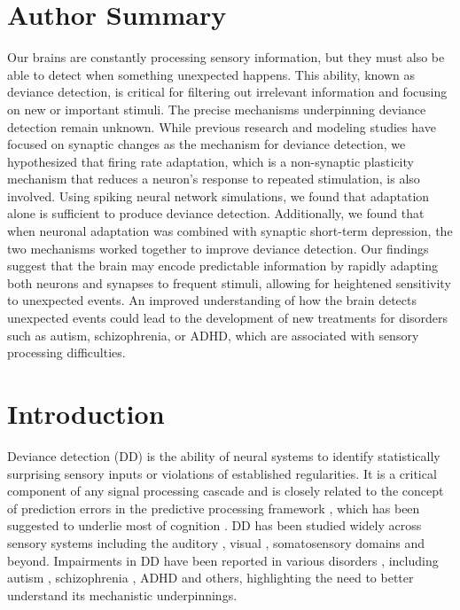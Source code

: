 \documentclass[9pt,lineno,onehalfspacing]{elife}
\begin{document}
\section{Author Summary}
Our brains are constantly processing sensory information, but they must also be able to detect when something unexpected happens. This ability, known as deviance detection, is critical for filtering out irrelevant information and focusing on new or important stimuli. The precise mechanisms underpinning deviance detection remain unknown. While previous research and modeling studies have focused on synaptic changes as the mechanism for deviance detection, we hypothesized that firing rate adaptation, which is a non-synaptic plasticity mechanism that reduces a neuron's response to repeated stimulation, is also involved. Using spiking neural network simulations, we found that adaptation alone is sufficient to produce deviance detection. Additionally, we found that when neuronal adaptation was combined with synaptic short-term depression, the two mechanisms worked together to improve deviance detection. Our findings suggest that the brain may encode predictable information by rapidly adapting both neurons and synapses to frequent stimuli, allowing for heightened sensitivity to unexpected events. An improved understanding of how the brain detects unexpected events could lead to the development of new treatments for disorders such as autism, schizophrenia, or ADHD, which are associated with sensory processing difficulties.


\section{Introduction}\label{sec:intro}

Deviance detection (DD) is the ability of neural systems to identify statistically surprising sensory inputs or violations of established regularities. It is a critical component of any signal processing cascade and is closely related to the concept of prediction errors in the predictive processing framework \citep{Bendixen2012-nx, Khouri2015-gr, Carbajal2018-sd, Fong2020-em}, which has been suggested to underlie most of cognition \citep{Friston2005-jz, Clark2015-gl}. DD has been studied widely across sensory systems including the auditory \citep{Nelken2014-wr, Escera2014-tv, Carbajal2018-sd}, visual \citep{Winkler2012-pr, Pazo-Alvarez2003-kv}, somatosensory \citep{Naatanen2009-jx} domains and beyond. Impairments in DD have been reported in various disorders \citep{Fong2020-em}, including autism \citep{Schwartz2018-bc, Goris2018-bv, Hudac2018-jl, Vlaskamp2017-vs, Chen2020-lu}, schizophrenia \citep{Koshiyama2020-ca, Kim2020-fb, Salisbury2020-sd, Tada2019-lj}, ADHD \citep{Kim2021-uj, Hsieh2021-ti, Lee2020-np} and others, highlighting the need to better understand its mechanistic underpinnings.
\end{document}
